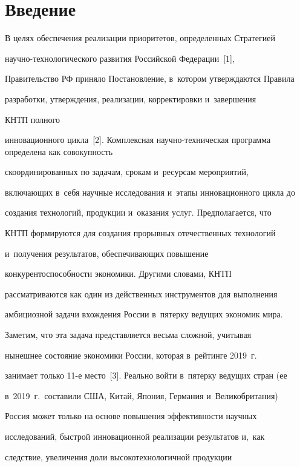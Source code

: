 


\section{Введение}



    В целях обеспечения реализации приоритетов, определенных Стратегией 

на\-уч\-но-тех\-но\-ло\-ги\-че\-ско\-го развития Российской Федерации~[1], 

Правительство РФ приняло Постановление, в~котором утверждаются Правила 

разработки, утверждения, реализации, корректировки и~завершения 

КНТП полного 

инновационного цикла~[2]. Комплексная на\-уч\-но-тех\-ни\-че\-ская программа определена как совокупность 

скоординированных по задачам, срокам и~ресурсам мероприятий, 

включающих в~себя научные исследования и~этапы инновационного цикла до 

создания технологий, продукции и~оказания услуг. Предполагается, что 

КНТП формируются для создания прорывных отечественных технологий 

и~получения результатов, обеспечивающих повышение 

конкурентоспособности экономики. Другими словами, КНТП 

рассматриваются как один из действенных инструментов для выполнения 

амбициозной задачи вхождения России в~пятерку ведущих экономик мира.

    

    Заметим, что эта задача представляется весьма сложной, учитывая 

нынешнее состояние экономики России, которая в~рейтинге 2019~г.\ 

занимает только 11-е место~[3]. Реально войти в~пятерку ведущих стран (ее 

в~2019~г.\ составили США, Китай, Япония, Германия и~Великобритания) 

Россия может только на основе повышения эффективности научных 

исследований, быстрой инновационной реализации результатов и,~как 

следствие, увеличения доли высокотехнологичной продукции 

